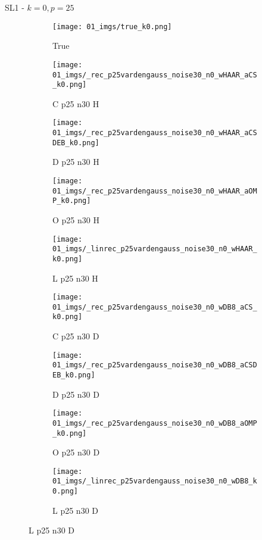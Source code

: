 \begin{frame}{SL1 - $k=0,p=25$}{}
\begin{figure}
\begin{subfigure}{0.1\textwidth}
\texttt{[image: 01\_imgs/true\_k0.png]}
\caption*{\Tiny True}
\end{subfigure}
\begin{subfigure}{0.1\textwidth}
\texttt{[image: 01\_imgs/\_rec\_p25vardengauss\_noise30\_n0\_wHAAR\_aCS\_k0.png]}
\caption*{\Tiny C p25 n30 H}
\end{subfigure}
\begin{subfigure}{0.1\textwidth}
\texttt{[image: 01\_imgs/\_rec\_p25vardengauss\_noise30\_n0\_wHAAR\_aCSDEB\_k0.png]}
\caption*{\Tiny D p25 n30 H}
\end{subfigure}
\begin{subfigure}{0.1\textwidth}
\texttt{[image: 01\_imgs/\_rec\_p25vardengauss\_noise30\_n0\_wHAAR\_aOMP\_k0.png]}
\caption*{\Tiny O p25 n30 H}
\end{subfigure}
\begin{subfigure}{0.1\textwidth}
\texttt{[image: 01\_imgs/\_linrec\_p25vardengauss\_noise30\_n0\_wHAAR\_k0.png]}
\caption*{\Tiny L p25 n30 H}
\end{subfigure}
\begin{subfigure}{0.1\textwidth}
\texttt{[image: 01\_imgs/\_rec\_p25vardengauss\_noise30\_n0\_wDB8\_aCS\_k0.png]}
\caption*{\Tiny C p25 n30 D}
\end{subfigure}
\begin{subfigure}{0.1\textwidth}
\texttt{[image: 01\_imgs/\_rec\_p25vardengauss\_noise30\_n0\_wDB8\_aCSDEB\_k0.png]}
\caption*{\Tiny D p25 n30 D}
\end{subfigure}
\begin{subfigure}{0.1\textwidth}
\texttt{[image: 01\_imgs/\_rec\_p25vardengauss\_noise30\_n0\_wDB8\_aOMP\_k0.png]}
\caption*{\Tiny O p25 n30 D}
\end{subfigure}
\begin{subfigure}{0.1\textwidth}
\texttt{[image: 01\_imgs/\_linrec\_p25vardengauss\_noise30\_n0\_wDB8\_k0.png]}
\caption*{\Tiny L p25 n30 D}
\end{subfigure}
\end{figure}
\end{frame}

